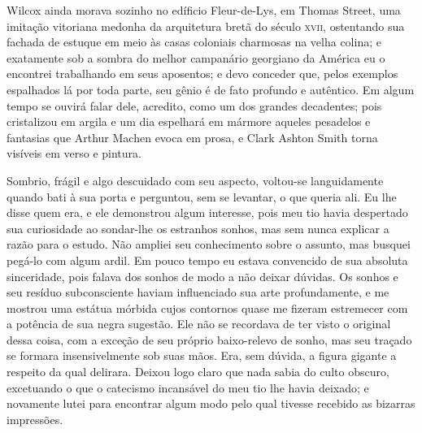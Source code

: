 \begin{pages}
\begin{Rightside}
Wilcox ainda morava sozinho no edíficio Fleur-de-Lys, em Thomas Street,
uma imitação vitoriana medonha da arquitetura bretã do século \textsc{xvii},
ostentando sua fachada de estuque em meio às casas coloniais charmosas
na velha colina; e exatamente sob a sombra do melhor campanário
georgiano da América eu o encontrei trabalhando em seus aposentos; e
devo conceder que, pelos exemplos espalhados lá por toda parte, seu
gênio é de fato profundo e autêntico. Em algum tempo se ouvirá falar
dele, acredito, como um dos grandes decadentes; pois cristalizou em
argila e um dia espelhará em mármore aqueles pesadelos e fantasias que
Arthur Machen evoca em prosa, e Clark Ashton Smith torna visíveis em verso e pintura.

Sombrio, frágil e algo descuidado com seu aspecto, voltou-se
languidamente quando bati à sua porta e perguntou, sem se levantar, o
que queria ali. Eu lhe disse quem era, e ele demonstrou algum interesse,
pois meu tio havia despertado sua curiosidade ao sondar-lhe os estranhos
sonhos, mas sem nunca explicar a razão para o estudo. Não ampliei seu
conhecimento sobre o assunto, mas busquei pegá-lo com algum ardil. Em
pouco tempo eu estava convencido de sua absoluta sinceridade, pois
falava dos sonhos de modo a não deixar dúvidas. Os sonhos e seu resíduo
subconsciente haviam influenciado sua arte profundamente, e me mostrou
uma estátua mórbida cujos contornos quase me fizeram estremecer com a
potência de sua negra sugestão. Ele não se recordava de ter visto o
original dessa coisa, com a exceção de seu próprio baixo-relevo de
sonho, mas seu traçado se formara insensivelmente sob suas mãos. Era,
sem dúvida, a figura gigante a respeito da qual delirara. Deixou logo
claro que nada sabia do culto obscuro, excetuando o que o catecismo
incansável do meu tio lhe havia deixado; e novamente lutei para
encontrar algum modo pelo qual tivesse recebido as bizarras impressões.


\end{Rightside}
\end{pages}
